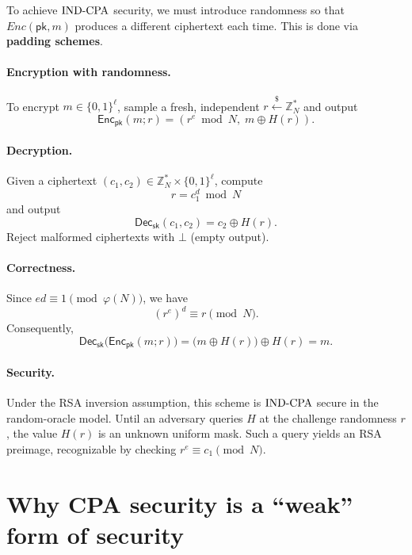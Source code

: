 To achieve $\text{IND-CPA}$ security, we must introduce randomness so that $Enc(\mathsf{pk}, m)$ produces a different ciphertext each time. This is done via \textbf{padding schemes}.


\paragraph{Encryption with randomness.}
To encrypt $m\in\{0,1\}^{\ell}$, sample a fresh, independent
$r\overset{\$}{\leftarrow}\mathbb{Z}_N^{*}$ and output
\[
    \boxed{
    \mathsf{Enc}_{\mathsf{pk}}(m;r)
    =
    \left(
        r^e \bmod N,\;
        m\oplus H(r)
    \right).
    }
\]

\paragraph{Decryption.}
Given a ciphertext
$(c_1,c_2)\in\mathbb{Z}_N^{*}\times\{0,1\}^{\ell}$,
compute
\[
    r = c_1^d \bmod N
\]
and output
\[
    \boxed{
    \mathsf{Dec}_{\mathsf{sk}}(c_1,c_2)
    =
    c_2\oplus H(r).
    }
\]
Reject malformed ciphertexts with $\bot$ (empty output).

\paragraph{Correctness.}
Since $ed\equiv 1\pmod{\varphi(N)}$, we have
\[
    (r^e)^d \equiv r \pmod N.
\]
Consequently,
\[
    \mathsf{Dec}_{\mathsf{sk}}
    \bigl(\mathsf{Enc}_{\mathsf{pk}}(m;r)\bigr)
    =
    \bigl(m\oplus H(r)\bigr)\oplus H(r)
    =
    m.
\]

\paragraph{Security.}
Under the RSA inversion assumption, this scheme is
$\text{IND-CPA}$ secure in the random-oracle model.
Until an adversary queries $H$ at the challenge randomness $r$,
the value $H(r)$ is an unknown uniform mask.
Such a query yields an RSA preimage, recognizable by checking
$r^e\equiv c_1\pmod N$.

\section{Why CPA security is a ``weak'' form of security}

